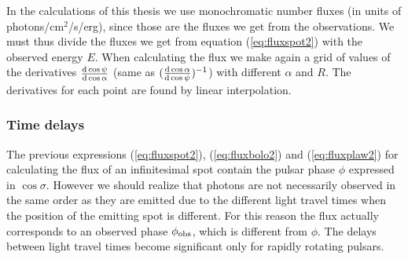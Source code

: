\documentclass{wihuri}
\def\msun{{\rm M_{\odot}}}
\def\d{{\rm d}}
\def\phiobs{\phi_{\rm obs}}
\begin{document}
In the calculations of this thesis we use monochromatic number fluxes (in units of photons/cm$^{2}$/s/erg), since those are the fluxes we get from the observations. We must thus divide the fluxes we get from equation (\ref{eq:fluxspot2}) with the observed energy $E$. When calculating the flux we make again a grid of values of the derivatives $\frac{\d\cos\psi}{\d\cos\alpha}$ (same as $(\frac{\d\cos\alpha}{\d\cos\psi})^{-1}$) with different $\alpha$ and $R$. The derivatives for each point are found by linear interpolation. 


\subsubsection{Time delays}



The previous expressions (\ref{eq:fluxspot2}), (\ref{eq:fluxbolo2}) and (\ref{eq:fluxplaw2}) for calculating the flux of an infinitesimal spot
contain the pulsar phase $\phi$ expressed in $\cos\sigma$. However we should realize that photons are not necessarily observed in the same order as they are emitted due to the different light travel times when the position of the emitting spot is different. For this reason the flux actually corresponds to an observed phase $\phiobs$, which is different from $\phi$. The delays between light travel times become significant only for rapidly rotating pulsars. %

   
\end{document}
